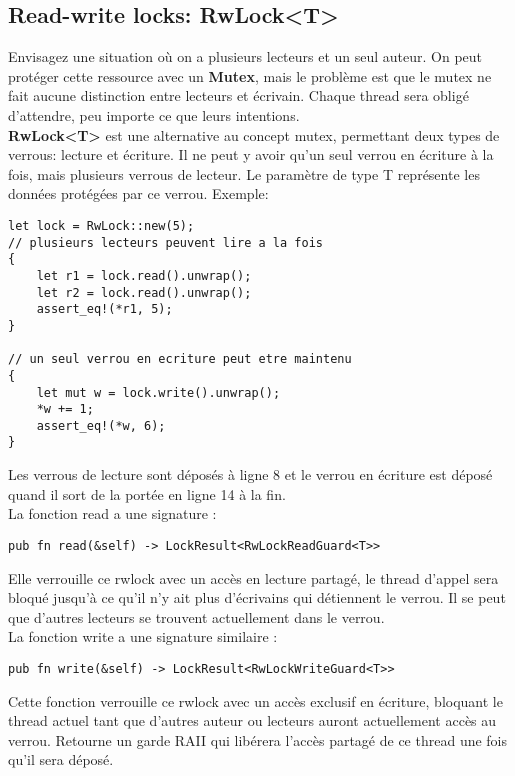 \documentclass{article}
\begin{document}
\subsection{Read-write locks: RwLock<T>}
Envisagez une situation où on a plusieurs lecteurs et un seul auteur. On peut protéger cette ressource avec un \textbf{Mutex}, mais le problème est que le mutex ne fait aucune distinction entre lecteurs et écrivain.
Chaque thread sera obligé d'attendre, peu importe ce que leurs intentions. \\
\textbf{RwLock<T>} est une alternative au concept mutex, permettant deux types de verrous: lecture et écriture. Il ne peut y avoir qu’un seul verrou en écriture à la fois, mais plusieurs verrous de lecteur. Le paramètre de type T représente les données protégées par ce verrou. 
Exemple:
\begin{lstlisting}
let lock = RwLock::new(5);
// plusieurs lecteurs peuvent lire a la fois
{
    let r1 = lock.read().unwrap();
    let r2 = lock.read().unwrap();
    assert_eq!(*r1, 5);
} 

// un seul verrou en ecriture peut etre maintenu
{
    let mut w = lock.write().unwrap();
    *w += 1;
    assert_eq!(*w, 6);
} 

\end{lstlisting}
Les verrous de lecture sont déposés à ligne 8 et le verrou en écriture est déposé quand il sort de la portée en ligne 14 à la fin.\\
La fonction read a une signature :
\begin{lstlisting}
pub fn read(&self) -> LockResult<RwLockReadGuard<T>>
\end{lstlisting}
Elle verrouille ce rwlock avec un accès en lecture partagé, le thread d'appel sera bloqué jusqu'à ce qu'il n'y ait plus d'écrivains qui détiennent le verrou. Il se peut que d’autres lecteurs se trouvent actuellement dans le verrou. \\
La fonction write a une signature similaire :
\begin{lstlisting}
pub fn write(&self) -> LockResult<RwLockWriteGuard<T>>
\end{lstlisting}
Cette fonction verrouille ce rwlock avec un accès exclusif en écriture, bloquant le thread actuel tant que d'autres auteur ou lecteurs auront actuellement accès au verrou.
Retourne un garde RAII qui libérera l'accès partagé de ce thread une fois qu'il sera déposé.
\end{document}
